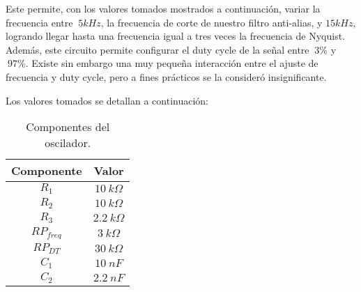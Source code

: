 Este permite, con los valores tomados mostrados a continuación, variar la frecuencia entre $~5kHz$, la frecuencia de corte de nuestro filtro anti-alias, y $15kHz$, logrando llegar hasta una frecuencia igual a tres veces la frecuencia de Nyquist. Además, este circuito permite configurar el duty cycle de la señal entre $~3\%$ y $~97\%$. Existe sin embargo una muy pequeña interacción entre el ajuste de frecuencia y duty cycle, pero a fines prácticos se la consideró insignificante.

Los valores tomados se detallan a continuación:

\begin{table}[H]
\centering
\begin{tabular}{cc}
\hline
Componente & Valor \\ \hline
$R_1$ & $10 \ k\Omega$ \\
$R_2$ & $10 \ k\Omega$ \\
$R_3$ & $2.2 \ k\Omega$  \\
$RP_{freq}$ & $3 \ k\Omega$  \\
$RP_{DT}$ & $30 \ k\Omega$  \\
$C_1$ & $10 \ nF$  \\
$C_2$ & $2.2 \ nF$\\ \hline
\end{tabular}
\caption{Componentes del oscilador.}
\end{table}

